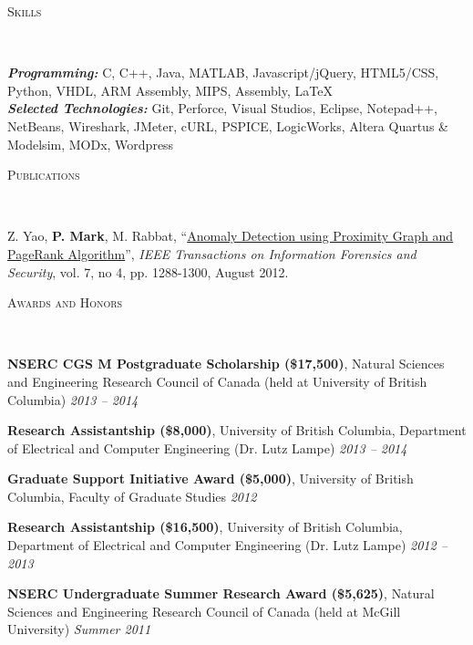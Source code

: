 \documentclass[letterpaper]{article}
\newenvironment{changemargin}[2]{%
  \begin{list}{}{%
    \setlength{\topsep}{0pt}%
    \setlength{\leftmargin}{#1}%
    \setlength{\rightmargin}{#2}%
    \setlength{\listparindent}{\parindent}%
    \setlength{\itemindent}{\parindent}%
    \setlength{\parsep}{\parskip}%
  }%
  \item[]}{\end{list}
}
\newcommand{\lineover}{
  \begin{changemargin}{-0.05in}{-0.05in}
    \vspace*{-8pt}
    \hrulefill \\
    \vspace*{-2pt}
  \end{changemargin}
}
\renewcommand{\section}[1]{
  \begin{changemargin}{-0.5in}{-0.5in}
    \normalsize \scshape{#1}\\
    \lineover
  \end{changemargin}
}
\newenvironment{body} {
  \vspace{2pt}
  \begin{changemargin}{-0.25in}{-0.5in}
    }{
  \end{changemargin}
}
\newcommand{\itemdescription}[3]{
  \textbf{#1}, {#2} \hfill \emph{#3}\\
  \medskip
}
\begin{document}
\section{Skills}
\begin{body}
\emph{\textbf{Programming:}}{} C, C++, Java, MATLAB, Javascript/jQuery,
HTML5/CSS, Python, VHDL, ARM Assembly, MIPS, Assembly, \LaTeX\\
\medskip
\emph{\textbf{Selected Technologies:}}{} Git, Perforce, Visual Studios, Eclipse,
Notepad++, NetBeans, Wireshark, JMeter, cURL, PSPICE, LogicWorks, Altera
Quartus \& Modelsim, MODx, Wordpress\\
\end{body}
\bigskip

\hypertarget{sec:publications}{}
\section{Publications}
\begin{body}
Z. Yao, \textbf{P. Mark}, M. Rabbat, 
``\href{http://ieeexplore.ieee.org/xpl/articleDetails.jsp?arnumber=6175122}
{Anomaly Detection using Proximity Graph and PageRank Algorithm}'', \emph{IEEE 
Transactions on Information Forensics and Security}, vol. 7, no 4, pp. 
1288-1300, August 2012.
\end{body}
\bigskip

\section{Awards and Honors}
\begin{body}
\itemdescription{NSERC CGS M Postgraduate Scholarship (\$17,500)}{Natural 
Sciences and Engineering Research Council of Canada (held at University of
British Columbia)}{2013 -- 2014}
\itemdescription{Research Assistantship (\$8,000)}{University of British
Columbia, Department of Electrical and Computer Engineering (Dr. Lutz
Lampe)}{2013 -- 2014}
\itemdescription{Graduate Support Initiative Award (\$5,000)}{University of
British Columbia, Faculty of Graduate Studies}{2012}
\itemdescription{Research Assistantship (\$16,500)}{University of British 
Columbia, Department of Electrical and Computer Engineering (Dr. Lutz 
Lampe)}{2012 -- 2013}
\itemdescription{NSERC Undergraduate Summer Research Award (\$5,625)}{Natural 
Sciences and Engineering Research Council of Canada (held at McGill
University)}{Summer 2011}
\end{body}
\medskip
\end{document}
